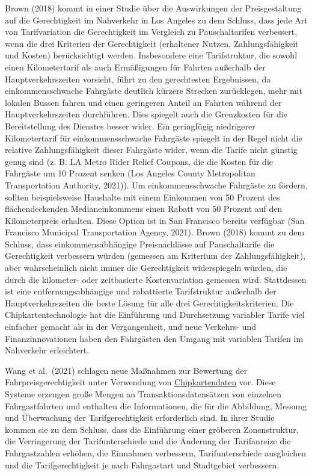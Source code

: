 \documentclass[
]{book}
\begin{document}
Brown (2018) kommt in einer Studie über die Auswirkungen der Preisgestaltung auf die Gerechtigkeit im Nahverkehr in Los Angeles zu dem Schluss, dass jede Art von Tarifvariation die Gerechtigkeit im Vergleich zu Pauschaltarifen verbessert, wenn die drei Kriterien der Gerechtigkeit (erhaltener Nutzen, Zahlungsfähigkeit und Kosten) berücksichtigt werden. Insbesondere eine Tarifstruktur, die sowohl einen Kilometertarif als auch Ermäßigungen für Fahrten außerhalb der Hauptverkehrszeiten vorsieht, führt zu den gerechtesten Ergebnissen, da einkommensschwache Fahrgäste deutlich kürzere Strecken zurücklegen, mehr mit lokalen Bussen fahren und einen geringeren Anteil an Fahrten während der Hauptverkehrszeiten durchführen. Dies spiegelt auch die Grenzkosten für die Bereitstellung des Dienstes besser wider. Ein geringfügig niedrigerer Kilometertarif für einkommensschwache Fahrgäste spiegelt in der Regel nicht die relative Zahlungsfähigkeit dieser Fahrgäste wider, wenn die Tarife nicht günstig genug sind (z. B. LA Metro Rider Relief Coupons, die die Kosten für die Fahrgäste um 10 Prozent senken (Los Angeles County Metropolitan Transportation Authority, 2021)). Um einkommensschwache Fahrgäste zu fördern, sollten beispielsweise Haushalte mit einem Einkommen von 50 Prozent des flächendeckenden Medianeinkommens einen Rabatt von 50 Prozent auf den Kilometerpreis erhalten. Diese Option ist in San Francisco bereits verfügbar (San Francisco Municipal Transportation Agency, 2021). Brown (2018) kommt zu dem Schluss, dass einkommensabhängige Preisnachlässe auf Pauschaltarife die Gerechtigkeit verbessern würden (gemessen am Kriterium der Zahlungsfähigkeit), aber wahrscheinlich nicht immer die Gerechtigkeit widerspiegeln würden, die durch die kilometer- oder zeitbasierte Kostenvariation gemessen wird. Stattdessen ist eine entfernungsabhängige und rabattierte Tarifstruktur außerhalb der Hauptverkehrszeiten die beste Lösung für alle drei Gerechtigkeitskriterien. Die Chipkartentechnologie hat die Einführung und Durchsetzung variabler Tarife viel einfacher gemacht als in der Vergangenheit, und neue Verkehrs- und Finanzinnovationen haben den Fahrgästen den Umgang mit variablen Tarifen im Nahverkehr erleichtert.

Wang et al.~(2021) schlagen neue Maßnahmen zur Bewertung der Fahrpreisgerechtigkeit unter Verwendung von \protect\hyperlink{contactless_cards}{Chipkartendaten} vor. Diese Systeme erzeugen große Mengen an Transaktionsdatensätzen von einzelnen Fahrgastfahrten und enthalten die Informationen, die für die Abbildung, Messung und Überwachung der Tarifgerechtigkeit erforderlich sind. In ihrer Studie kommen sie zu dem Schluss, dass die Einführung einer gröberen Zonenstruktur, die Verringerung der Tarifunterschiede und die Änderung der Tarifanreize die Fahrgastzahlen erhöhen, die Einnahmen verbessern, Tarifunterschiede ausgleichen und die Tarifgerechtigkeit je nach Fahrgastart und Stadtgebiet verbessern.
\end{document}

